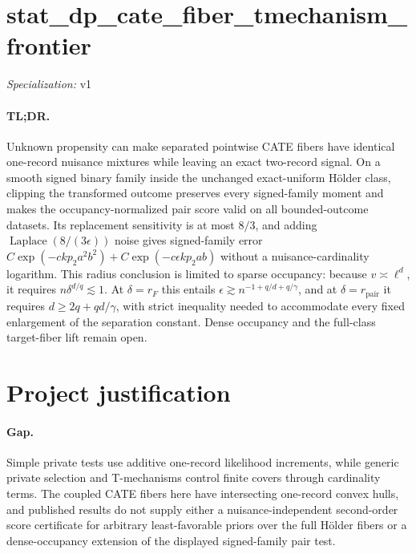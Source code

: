 \documentclass{article}
\begin{document}
\sloppy

\section*{stat\_\allowbreak{}dp\_\allowbreak{}cate\_\allowbreak{}fiber\_\allowbreak{}tmechanism\_\allowbreak{}frontier}

\noindent\textit{Specialization:} v1\par

\paragraph{TL;DR.} Unknown propensity can make separated pointwise CATE fibers have identical one-record nuisance mixtures while leaving an exact two-record signal. On a smooth signed binary family inside the unchanged exact-uniform Hölder class, clipping the transformed outcome preserves every signed-family moment and makes the occupancy-normalized pair score valid on all bounded-outcome datasets. Its replacement sensitivity is at most \(8/3\), and adding \(\operatorname{Laplace}(8/(3\epsilon))\) noise gives signed-family error \(C\exp(-ckp_2a^2b^2)+C\exp(-c\epsilon kp_2ab)\) without a nuisance-cardinality logarithm. This radius conclusion is limited to sparse occupancy: because \(v\asymp\ell^d\), it requires \(n\delta^{d/q}\lesssim1\). At \(\delta=r_F\) this entails \(\epsilon\gtrsim n^{-1+q/d+q/\gamma}\), and at \(\delta=r_{\mathrm{pair}}\) it requires \(d\ge2q+qd/\gamma\), with strict inequality needed to accommodate every fixed enlargement of the separation constant. Dense occupancy and the full-class target-fiber lift remain open.

\section{Project justification}

\paragraph{Gap.} Simple private tests use additive one-record likelihood increments, while generic private selection and T-mechanisms control finite covers through cardinality terms. The coupled CATE fibers here have intersecting one-record convex hulls, and published results do not supply either a nuisance-independent second-order score certificate for arbitrary least-favorable priors over the full Hölder fibers or a dense-occupancy extension of the displayed signed-family pair test.
\end{document}
